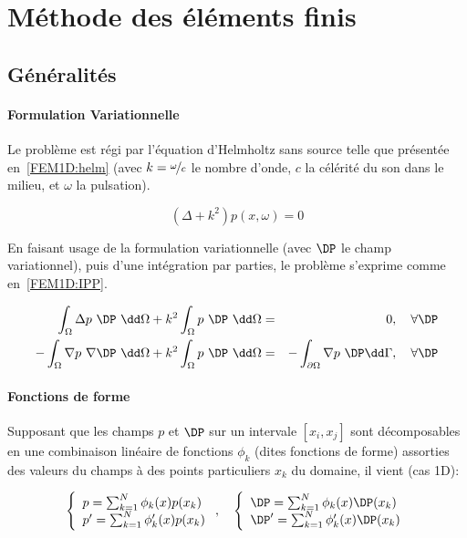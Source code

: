\section{Méthode des éléments finis}


\subsection{Généralités}
\label{FEM1D:subsection:linear}

\paragraph{Formulation Variationnelle}

Le problème est régi par l'équation d'Helmholtz sans source telle que présentée en~\eqref{FEM1D:helm} (avec $k =
\nicefrac{\omega}{c}$ le nombre d'onde, $c$ la célérité du son dans le milieu, et $\omega$ la pulsation).

\begin{equation}
	(\Delta + k^2)p(x,\omega) = 0 \label{FEM1D:helm}
\end{equation}

En faisant usage de la formulation variationnelle (avec $\DP$ le champ variationnel), puis d'une intégration par
parties, le problème s'exprime comme en~\eqref{FEM1D:IPP}.

\begin{eqnarray}
	\int_\Omega \Delta p~\DP~\dd\Omega + k^2 \int_\Omega p~\DP~\dd\Omega & =  & 0,\quad \forall\DP\notag\\
	- \int_\Omega \nabla p~\nabla \DP ~\dd\Omega + k^2\int_\Omega p~\DP~\dd\Omega & = & -\int_{\partial\Omega}\nabla p~\DP\dd\Gamma, \quad \forall\DP \label{FEM1D:IPP}
\end{eqnarray}

\paragraph{Fonctions de forme}

Supposant que les champs $p$ et $\DP$ sur un intervale $[x_i, x_j]$ sont décomposables en une combinaison linéaire de
fonctions $\phi_k$ (dites fonctions de forme) assorties des valeurs du champs à des points particuliers $x_k$ du domaine, il
vient (cas 1D):

\begin{equation}
	\left\{\begin{array}{l}
		p = \sum_{k=1}^N \phi_k(x)p(x_k)\\
		p' = \sum_{k=1}^N \phi_k'(x)p(x_k)\\
	\end{array}\right., \quad
	\left\{\begin{array}{l}
		\DP = \sum_{k=1}^N \phi_k(x)\DP(x_k)\\
		\DP' = \sum_{k=1}^N \phi_k'(x)\DP(x_k)\\
	\end{array}\right.\label{FEM1D:shapefun}
\end{equation}

